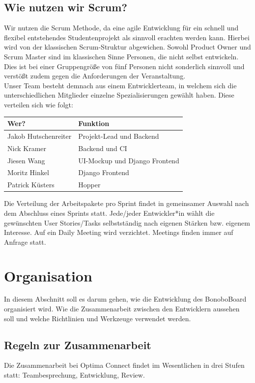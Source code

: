 \documentclass[a4paper,11pt]{scrartcl}
\begin{document}
\subsection{Wie nutzen wir Scrum?}
Wir nutzen die Scrum Methode, da eine agile Entwicklung für ein schnell und flexibel entstehendes Studentenprojekt als sinnvoll erachten werden kann. Hierbei wird von der klassischen Scrum-Struktur abgewichen. Sowohl Product Owner und Scrum Master sind im klassischen Sinne Personen, die nicht selbst entwickeln. Dies ist bei einer Gruppengröße von fünf Personen nicht sonderlich sinnvoll und verstößt zudem gegen die Anforderungen der Veranstaltung. \\
Unser Team besteht demnach aus einem Entwicklerteam, in welchem sich die unterschiedlichen Mitglieder einzelne Spezialisierungen gewählt haben. Diese verteilen sich wie folgt:
\begin{table}[H]
\begin{tabular}{|p{4.5cm}|p{8cm}|}
\hline
\textbf{Wer?} & \textbf{Funktion}\\ \hline
 Jakob Hutschenreiter &  Projekt-Lead und Backend\\ \hline
 Nick Kramer &  Backend und CI\\ \hline
 Jiesen Wang &   UI-Mockup und Django Frontend\\ \hline
 Moritz Hinkel &   Django Frontend\\ \hline
 Patrick Küsters &  Hopper\\ \hline
\end{tabular}
\end{table}

Die Verteilung der Arbeitspakete pro Sprint findet in gemeinsamer Auswahl nach dem Abschluss eines Sprints statt. Jede/jeder Entwickler*in wählt die gewünschten User Stories/Tasks selbstständig nach eigenen Stärken bzw. eigenem Interesse. Auf ein Daily Meeting wird verzichtet. Meetings finden immer auf Anfrage statt. 
\section{Organisation}\label{sec:organisation}
In diesem Abschnitt soll es darum gehen, wie die Entwicklung des BonoboBoard organisiert wird.  Wie die Zusammenarbeit zwischen den Entwicklern aussehen soll und welche Richtlinien und Werkzeuge verwendet werden.
\subsection{Regeln zur Zusammenarbeit}
Die Zusammenarbeit bei Optima Connect findet im Wesentlichen in drei Stufen statt: Teambesprechung, Entwicklung, Review.
\end{document}
